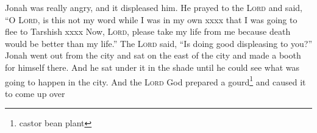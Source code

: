 
\begin{inparaenum}
     Jonah was really angry, and it displeased him.%
     He prayed to the \textsc{Lord} and said, ``O \textsc{Lord}, is this not my word while I was in my own xxxx that I was going to flee to Tarshish xxxx%
     Now, \textsc{Lord}, please take my life from me because death would be better than my life.''%
     The \textsc{Lord} said, ``Is doing good displeasing to you?''%
     Jonah went out from the city and sat on the east of the city and made a booth for himself there. And he sat under it in the shade until he could see what was going to happen in the city.%
     And the \textsc{Lord} God prepared a gourd\footnote{castor bean plant} and caused it to come up over %
\end{inparaenum}

